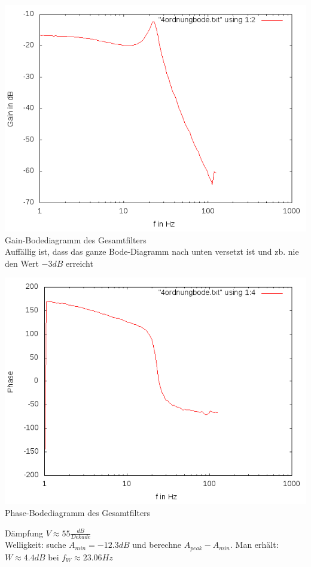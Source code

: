 \documentclass[compress,11pt]{beamer}
\begin{document}
\begin{frame}
\includegraphics[width=.7\textwidth]{4aufgabe/4stufegain}\\
Gain-Bodediagramm des Gesamtfilters\\
Auffällig ist, dass das ganze Bode-Diagramm nach unten versetzt ist und zb. nie den Wert $-3 dB $ erreicht
\end{frame}
\begin{frame}
\includegraphics[width=.7\textwidth]{4aufgabe/4stufephase}\\
Phase-Bodediagramm des Gesamtfilters
\end{frame}
\begin{frame}
Dämpfung $V \approx 55 \frac{dB}{Dekade}$\\
Welligkeit: suche $A_{min} = -12.3 dB$ und berechne $A_{peak} - A_{min}$. Man erhält: $W \approx 4.4 dB$
bei $f_W \approx 23.06 Hz$
\end{frame}
\begin{frame}

\end{frame}
\end{document}
